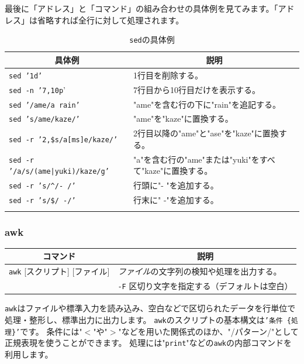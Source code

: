 \documentclass[a4j]{ltjreport}
\begin{document}
    最後に「アドレス」と「コマンド」の組み合わせの具体例を見てみます。「アドレス」は省略すれば全行に対して処理されます。
    \begin{longtable}[c]{|l|l|}
        \hline
        \multicolumn{1}{|c|}{\textbf{具体例}}&\multicolumn{1}{|c|}{\textbf{説明}}\\
        \hline\hline
        \texttt{sed '1d'} & 1行目を削除する。\\
        \hline
        \texttt{sed -n '7,10p}' & 7行目から10行目だけを表示する。\\
        \hline
        \texttt{sed '/ame/a rain'} & "ame"を含む行の下に"rain"を追記する。\\
        \hline
        \texttt{sed 's/ame/kaze/'} & "ame"を"kaze"に置換する。\\
        \hline
        \texttt{sed -r '2,\$s/a[ms]e/kaze/'} & 2行目以降の"ame"と"ase"を"kaze"に置換する。\\
        \hline
        \texttt{sed -r '/a/s/(ame|yuki)/kaze/g'} & "a"を含む行の"ame"または"yuki"をすべて"kaze"に置換する。\\
        \hline
        \texttt{sed -r 's/\textasciicircum/- /'} & 行頭に"- "を追加する。\\
        \hline
        \texttt{sed -r 's/\$/ -/'} & 行末に" -"を追加する。   \\
        \hline
        \caption{\texttt{sed}の具体例}
    \end{longtable}


    \subsubsection{awk} 

    \begin{longtable}[c]{|p{3.5cm}|p{13.5cm}|}
        \hline
        \multicolumn{1}{|c|}{\textbf{コマンド}}&\multicolumn{1}{|c|}{\textbf{説明}}\\
        \hline\hline
        \texttt{awk} {\footnotesize [スクリプト] [ファイル]} &\emph{ファイル}の文字列の検知や処理を出力する。 \\
        &\texttt{-F} 区切り文字を指定する（デフォルトは空白）\\
        \hline
    \end{longtable}

    \texttt{awk}はファイルや標準入力を読み込み、空白などで区切られたデータを行単位で処理・整形し、標準出力に出力します。
    \texttt{awk}のスクリプトの基本構文は\texttt{'条件 \{処理\}'}です。
    条件には"$<$"や"$>$"などを用いた関係式のほか、"/パターン/"として正規表現を使うことができます。
    処理には"\texttt{print}"などの\texttt{awk}の内部コマンドを利用します。
\end{document}
